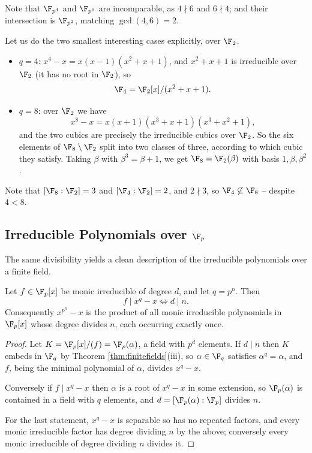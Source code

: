 Note that $\F_{p^4}$ and $\F_{p^6}$ are incomparable, as $4 \nmid 6$ and $6 \nmid 4$; and their intersection is $\F_{p^2}$, matching $\gcd(4,6) = 2$.

\begin{example}
	Let us do the two smallest interesting cases explicitly, over $\F_2$.
	\begin{itemize}
		\item $q = 4$: $x^4 - x = x(x-1)(x^2+x+1)$, and $x^2+x+1$ is irreducible over $\F_2$ (it has no root in $\F_2$), so
		$$\F_4 = \F_2[x]/(x^2+x+1).$$
		\item $q = 8$: over $\F_2$ we have
		$$x^8-x = x(x+1)(x^3+x+1)(x^3+x^2+1),$$
		and the two cubics are precisely the irreducible cubics over $\F_2$. So the six elements of $\F_8 \setminus \F_2$ split into two classes of three, according to which cubic they satisfy. Taking $\beta$ with $\beta^3 = \beta + 1$, we get $\F_8 = \F_2(\beta)$ with basis $1, \beta, \beta^2$.
	\end{itemize}
	Note that $[\F_8:\F_2] = 3$ and $[\F_4:\F_2] = 2$, and $2 \nmid 3$, so $\F_4 \not\subseteq \F_8$ -- despite $4 < 8$.
\end{example}

\subsection{Irreducible Polynomials over $\F_p$}

The same divisibility yields a clean description of the irreducible polynomials over a finite field.

\begin{proposition}\label{prop:irredfp}
	Let $f \in \F_p[x]$ be monic irreducible of degree $d$, and let $q = p^n$. Then
	$$f \mid x^q - x \iff d \mid n.$$
	Consequently $x^{p^n}-x$ is the product of all monic irreducible polynomials in $\F_p[x]$ whose degree divides $n$, each occurring exactly once.
\end{proposition}

\begin{proof}
	Let $K = \F_p[x]/(f) = \F_p(\alpha)$, a field with $p^d$ elements. If $d \mid n$ then $K$ embeds in $\F_q$ by Theorem \ref{thm:finitefields}(iii), so $\alpha \in \F_q$ satisfies $\alpha^q = \alpha$, and $f$, being the minimal polynomial of $\alpha$, divides $x^q-x$.

	Conversely if $f \mid x^q - x$ then $\alpha$ is a root of $x^q-x$ in some extension, so $\F_p(\alpha)$ is contained in a field with $q$ elements, and $d = [\F_p(\alpha):\F_p]$ divides $n$.

	For the last statement, $x^q-x$ is separable so has no repeated factors, and every monic irreducible factor has degree dividing $n$ by the above; conversely every monic irreducible of degree dividing $n$ divides it.
\end{proof}

